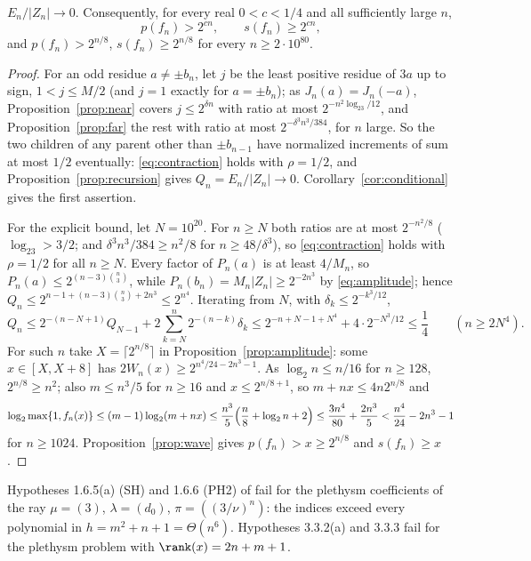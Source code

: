 \begin{theorem}\label{thm:indices}
$E_n/|Z_n|\to0$. Consequently, for every real $0<c<1/4$ and all sufficiently
large $n$,
\[
 p(f_n)>2^{cn},\qquad s(f_n)\ge2^{cn},
\]
and $p(f_n)>2^{n/8}$, $s(f_n)\ge2^{n/8}$ for every $n\ge2\cdot10^{80}$.
\end{theorem}

\begin{proof}
For an odd residue $a\ne\pm b_n$, let $j$ be the least positive residue of $3a$
up to sign, $1<j\le M/2$ (and $j=1$ exactly for $a=\pm b_n$); as
$J_n(a)=J_n(-a)$, Proposition~\ref{prop:near} covers $j\le2^{\delta n}$ with
ratio at most $2^{-n^2\log_23/12}$, and Proposition~\ref{prop:far} the rest with
ratio at most $2^{-\delta^3n^3/384}$, for $n$ large. So the two children of any parent other than $\pm b_{n-1}$ have normalized increments of
sum at most $1/2$ eventually: \eqref{eq:contraction} holds with $\rho=1/2$, and
Proposition~\ref{prop:recursion} gives $Q_n=E_n/|Z_n|\to0$.
Corollary~\ref{cor:conditional} gives the first assertion.

For the explicit bound, let $N=10^{20}$. For $n\ge N$ both ratios are at most
$2^{-n^2/8}$ ($\log_23>3/2$; and $\delta^3n^3/384\ge n^2/8$ for
$n\ge48/\delta^3$), so \eqref{eq:contraction} holds with $\rho=1/2$ for all
$n\ge N$. Every factor of $P_n(a)$ is at least $4/M_n$, so
$P_n(a)\le2^{(n-3)\binom n3}$, while $P_n(b_n)=M_n|Z_n|\ge2^{-2n^3}$ by
\eqref{eq:amplitude}; hence $Q_n\le2^{n-1+(n-3)\binom n3+2n^3}\le2^{n^4}$.
Iterating from $N$, with $\delta_k\le2^{-k^3/12}$,
\[
 Q_n\le2^{-(n-N+1)}Q_{N-1}+2\sum_{k=N}^n2^{-(n-k)}\delta_k
 \le2^{-n+N-1+N^4}+4\cdot2^{-N^3/12}\le\frac14\qquad(n\ge2N^4).
\]
For such $n$ take $X=\lceil2^{n/8}\rceil$ in Proposition~\ref{prop:amplitude}:
some $x\in[X,X+8]$ has $2W_n(x)\ge2^{n^4/24-2n^3-1}$. As $\log_2n\le n/16$ for
$n\ge128$, $2^{n/8}\ge n^2$; also $m\le n^3/5$ for $n\ge16$ and $x\le2^{n/8+1}$,
so $m+nx\le4n2^{n/8}$ and
\[
 \log_2\max\{1,f_n(x)\}\le(m-1)\log_2(m+nx)\le\frac{n^3}5\Bigl(\frac n8+
 \log_2n+2\Bigr)\le\frac{3n^4}{80}+\frac{2n^3}5<\frac{n^4}{24}-2n^3-1
\]
for $n\ge1024$. Proposition~\ref{prop:wave} gives $p(f_n)>x\ge2^{n/8}$ and
$s(f_n)\ge x$.
\end{proof}

\begin{corollary}\label{cor:PH2SH}
Hypotheses 1.6.5(a) (SH) and 1.6.6 (PH2) of \cite{GCT6} fail for the plethysm
coefficients of the ray $\mu=(3)$, $\lambda=(d_0)$, $\pi=((3/\nu)^n)$: the
indices exceed every polynomial in $h=m^2+n+1=\Theta(n^6)$. Hypotheses
3.3.2(a) and 3.3.3 fail for the plethysm problem with $\rank(x)=2n+m+1$.
\end{corollary}

